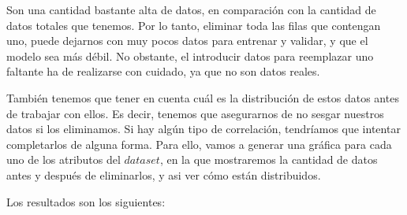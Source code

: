 \documentclass[11pt,a4paper]{article}
\begin{document}
Son una cantidad bastante alta de datos, en comparación con la cantidad de datos totales que tenemos. Por lo tanto, eliminar toda
las filas que contengan uno, puede dejarnos con muy pocos datos para entrenar y validar, y que el modelo sea más débil. No obstante,
el introducir datos para reemplazar uno faltante ha de realizarse con cuidado, ya que no son datos reales.

También tenemos que tener en cuenta cuál es la distribución de estos datos antes de trabajar con ellos. Es decir, tenemos que
asegurarnos de no sesgar nuestros datos si los eliminamos. Si hay algún tipo de correlación, tendríamos que intentar completarlos
de alguna forma. Para ello, vamos a generar una gráfica para cada uno de los atributos del $dataset$, en la que mostraremos la
cantidad de datos antes y después de eliminarlos, y asi ver cómo están distribuidos.

\newpage
Los resultados son los siguientes:
\end{document}
